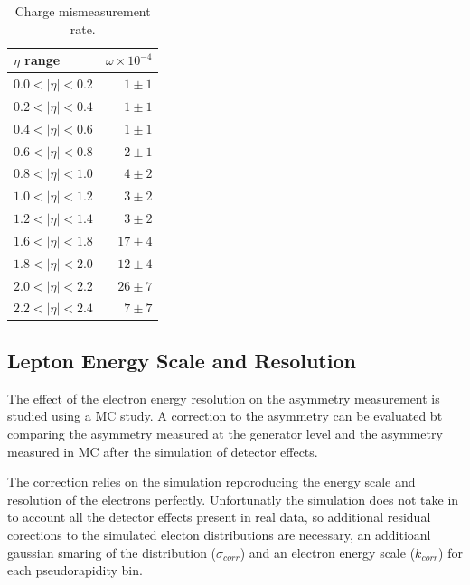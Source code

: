 \begin{table}[htbp]
  \begin{center}
\begin{tabular}{lr}
\toprule
$\eta$ range        & $\omega \times 10^{-4}$    \\
\midrule
$0.0<| \eta |<0.2$  & $ 1 \pm 1 $    \\ 
$0.2<| \eta |<0.4$  & $ 1 \pm 1 $    \\
$0.4<| \eta |<0.6$  & $ 1 \pm 1 $    \\
$0.6<| \eta |<0.8$  & $ 2 \pm 1 $    \\
$0.8<| \eta |<1.0$  & $ 4 \pm 2 $    \\ 
$1.0<| \eta |<1.2$  & $ 3 \pm 2 $    \\
$1.2<| \eta |<1.4$  & $ 3 \pm 2 $    \\
$1.6<| \eta |<1.8$  & $17 \pm 4 $    \\
$1.8<| \eta |<2.0$  & $12 \pm 4 $    \\
$2.0<| \eta |<2.2$  & $26 \pm 7 $    \\
$2.2<| \eta |<2.4$  & $ 7 \pm 7 $    \\
\bottomrule
\end{tabular}
\caption{\label{tab:mischarge}Charge mismeasurement rate.}
\end{center}
\end{table}

\subsection{Lepton Energy Scale and Resolution}
The effect of the electron energy resolution on the asymmetry measurement is
studied using a \ac{MC} study. A correction to the asymmetry can be evaluated bt
comparing the asymmetry measured at the generator level and the asymmetry
measured in \ac{MC} after the simulation of detector effects.

The correction relies on the simulation reporoducing the energy scale and
resolution of the electrons perfectly. Unfortunatly the simulation does not take
in to account all the detector effects present in real data, so additional
residual corections to the simulated electon \pT distributions are necessary, an
additioanl gaussian smaring of the \pT distribution ($\sigma_{corr}$) and an electron
energy scale ($k_{corr}$) for each pseudorapidity bin.

